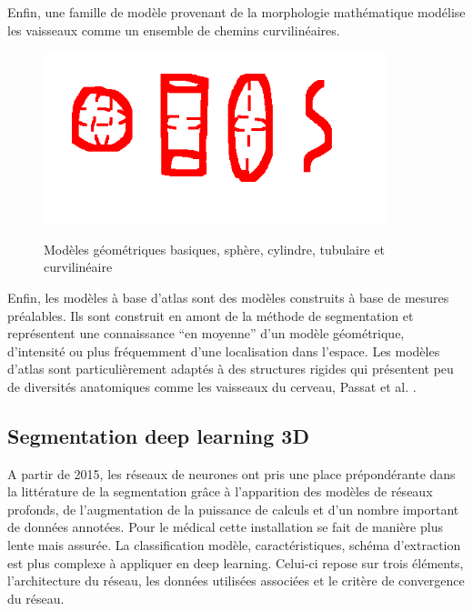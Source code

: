 Enfin, une famille de modèle provenant de la morphologie mathématique modélise les vaisseaux comme un ensemble de chemins curvilinéaires.\cite{Heijmans2005_path_opening}

\begin{figure}
  \centering
  \includegraphics[height=5cm]{Images/geometricModels.png}
  \label{fig:geometricModels}
  \caption{Modèles géométriques basiques, sphère, cylindre, tubulaire et curvilinéaire}
\end{figure}

Enfin, les modèles à base d'atlas sont des modèles construits à base de mesures préalables. Ils sont construit en amont de la méthode de segmentation et représentent une connaissance ``en moyenne'' d'un modèle géométrique, d'intensité ou plus fréquemment d'une localisation dans l'espace. Les modèles d'atlas sont particulièrement adaptés à des structures rigides qui présentent peu de diversités anatomiques comme les vaisseaux du cerveau, Passat et al. \cite{passat2006_atlas}.

\subsection{Segmentation deep learning 3D}
\label{sec:EA:segmentation_deep3D}

A partir de 2015, les réseaux de neurones ont pris une place prépondérante dans la littérature de la segmentation grâce à l'apparition des modèles de réseaux profonds, de l'augmentation de la puissance de calculs et d'un nombre important de données annotées. Pour le médical cette installation se fait de manière plus lente mais assurée. La classification  modèle, caractéristiques, schéma d'extraction est plus complexe à appliquer en deep learning. Celui-ci repose sur trois éléments, l'architecture du réseau, les données utilisées associées et le critère de convergence du réseau.

